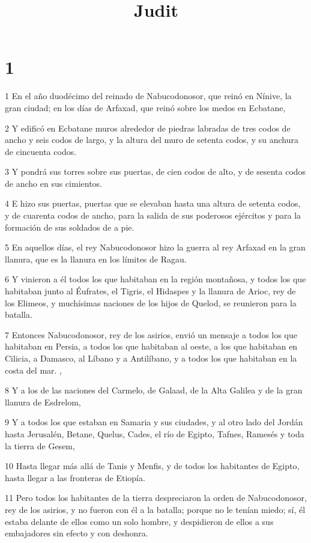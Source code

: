 

\title{Judit}


\chapter{1}

\par 1 En el año duodécimo del reinado de Nabucodonosor, que reinó en Nínive, la gran ciudad; en los días de Arfaxad, que reinó sobre los medos en Ecbatane,
\par 2 Y edificó en Ecbatane muros alrededor de piedras labradas de tres codos de ancho y seis codos de largo, y la altura del muro de setenta codos, y su anchura de cincuenta codos.
\par 3 Y pondrá sus torres sobre sus puertas, de cien codos de alto, y de sesenta codos de ancho en sus cimientos.
\par 4 E hizo sus puertas, puertas que se elevaban hasta una altura de setenta codos, y de cuarenta codos de ancho, para la salida de sus poderosos ejércitos y para la formación de sus soldados de a pie.
\par 5 En aquellos días, el rey Nabucodonosor hizo la guerra al rey Arfaxad en la gran llanura, que es la llanura en los límites de Ragau.
\par 6 Y vinieron a él todos los que habitaban en la región montañosa, y todos los que habitaban junto al Éufrates, el Tigris, el Hidaspes y la llanura de Arioc, rey de los Elimeos, y muchísimas naciones de los hijos de Quelod, se reunieron para la batalla.
\par 7 Entonces Nabucodonosor, rey de los asirios, envió un mensaje a todos los que habitaban en Persia, a todos los que habitaban al oeste, a los que habitaban en Cilicia, a Damasco, al Líbano y a Antilíbano, y a todos los que habitaban en la costa del mar. ,
\par 8 Y a los de las naciones del Carmelo, de Galaad, de la Alta Galilea y de la gran llanura de Esdrelom,
\par 9 Y a todos los que estaban en Samaria y sus ciudades, y al otro lado del Jordán hasta Jerusalén, Betane, Quelus, Cades, el río de Egipto, Tafnes, Ramesés y toda la tierra de Gesem,
\par 10 Hasta llegar más allá de Tanis y Menfis, y de todos los habitantes de Egipto, hasta llegar a las fronteras de Etiopía.
\par 11 Pero todos los habitantes de la tierra despreciaron la orden de Nabucodonosor, rey de los asirios, y no fueron con él a la batalla; porque no le tenían miedo; sí, él estaba delante de ellos como un solo hombre, y despidieron de ellos a sus embajadores sin efecto y con deshonra.
